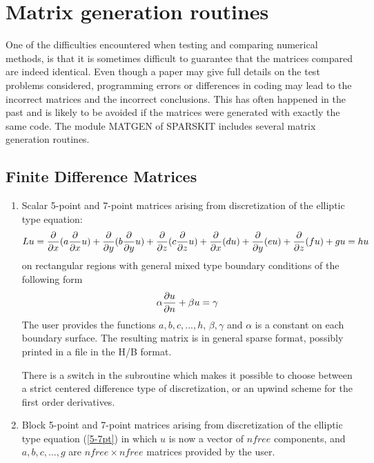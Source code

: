 \documentclass[12pt]{article}
\def\del{\partial} %
\def\nref#1{(\ref{#1})}
\begin{document}

\section{Matrix generation routines}
One of the difficulties encountered when testing and comparing
numerical methods, is that it is sometimes difficult to 
guarantee that the matrices compared are indeed identical.
Even though a paper may give full details on the test
problems considered, programming errors or differences in coding
may lead to the incorrect matrices and the incorrect conclusions.
This has often happened in the past and is likely to be avoided  if 
the matrices were generated with exactly the same code. 
The module MATGEN of
SPARSKIT includes several matrix generation routines.

\subsection{Finite Difference Matrices}

\begin{enumerate}
\item Scalar 5-point and 7-point matrices arising 
from discretization of the elliptic type equation:
\begin{equation}
L u = {\del \over \del x} ( a   {\del \over \del x } u ) 
+ {\del \over \del y } ( b   {\del \over \del y }  u) 
+ {\del \over \del z } ( c   {\del \over \del z } u ) 
+ {\del \over \del x } ( d   u ) + {\del \over \del y }  (e   u) 
+ {\del \over \del z } ( f   u ) + g   u  = h u
\label{5-7pt}
\end{equation} 
on rectangular regions with general mixed type boundary conditions of
the following form
\[ \alpha {\del u \over \del n} + \beta u = \gamma \]
The user provides the functions $a, b, c, ...,h$, $\beta, \gamma$ and
$\alpha$ is a constant on each boundary surface. The resulting 
matrix is in general sparse format, possibly printed in a file
in the H/B format. 

There is a switch in the subroutine which makes it possible to choose
between a strict centered difference type of discretization, or an
upwind scheme for the first order derivatives.

\item
Block 5-point and 7-point matrices arising 
from discretization of the elliptic type equation \nref{5-7pt}
in which $u$ is now a vector of $nfree$ components, and
$a,b,c, ..., g$ are $nfree \times  nfree $ matrices provided by the
user.

\end{enumerate}
\end{document}
